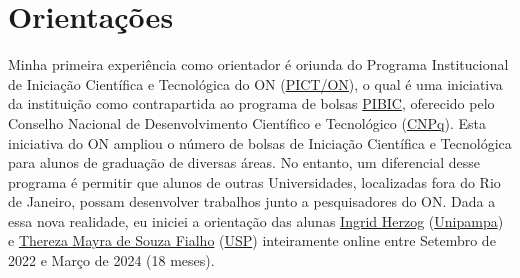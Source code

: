 \documentclass[10pt,a4paper,oneside]{book}
\begin{document}
\section{Orientações}
\label{sec_orientacao}

Minha primeira experiência como orientador é oriunda do Programa Institucional de Iniciação Científica e Tecnológica do ON (\href{https://www.gov.br/observatorio/pt-br/assuntos/programas-academicos/iniciacao-cientifica-e-tecnologica/apresentacao}{PICT/ON}), o qual é uma iniciativa da instituição como contrapartida ao programa de bolsas \href{http://portal-adm.cnpq.br/web/guest/pibic/}{PIBIC}, oferecido pelo Conselho Nacional de Desenvolvimento Científico e Tecnológico (\href{https://www.gov.br/cnpq/pt-br}{CNPq}). Esta iniciativa do ON ampliou o número de bolsas de Iniciação Científica e Tecnológica para alunos de graduação de diversas áreas. No entanto, um diferencial desse programa é permitir que alunos de outras Universidades, localizadas fora do Rio de Janeiro, possam desenvolver trabalhos junto a pesquisadores do ON. Dada a essa nova realidade, eu iniciei a orientação das alunas \href{http://lattes.cnpq.br/4746789434324199}{Ingrid Herzog} (\href{https://unipampa.edu.br/portal/}{Unipampa}) e \href{http://lattes.cnpq.br/6698175242371919}{Thereza Mayra de Souza Fialho} (\href{https://www5.usp.br/}{USP}) inteiramente online entre Setembro de 2022 e Março de 2024 (18 meses).
\end{document}
